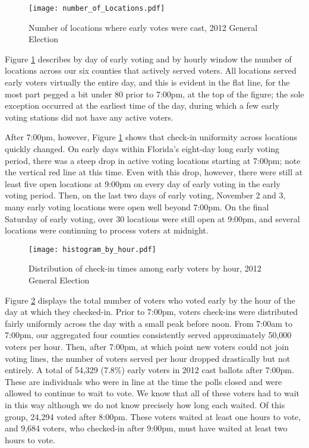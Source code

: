 \documentclass[12pt,titlepage]{article}
\begin{document}


\begin{figure}[!ht]
  \caption{Number of locations where early votes were cast, 2012
    General Election}
  \label{fig:nrlocs2012}
  \centering
    \centering\texttt{[image: number\_of\_Locations.pdf]}
\end{figure}

Figure \ref{fig:nrlocs2012} describes by day of early voting and by
hourly window the number of locations across our six counties that
actively served voters.  All locations served early voters virtually
the entire day, and this is evident in the flat line, for the most
part pegged a bit under 80 prior to 7:00pm, at the top of the figure;
the sole exception occurred at the earliest time of the day, during
which a few early voting stations did not have any active voters.

After 7:00pm, however, Figure \ref{fig:nrlocs2012} shows that check-in
uniformity across locations quickly changed.  On early days within
Florida's eight-day long early voting period, there was a steep drop
in active voting locations starting at 7:00pm; note the vertical red
line at this time.  Even with this drop, however, there were still at
least five open locations at 9:00pm on every day of early voting in
the early voting period.  Then, on the last two days of early voting,
November 2 and 3, many early voting locations were open well beyond
7:00pm.  On the final Saturday of early voting, over 30 locations were
still open at 9:00pm, and several locations were continuing to process
voters at midnight.

\begin{figure}[!ht]
\caption{Distribution of check-in times among early voters by hour, 2012
  General Election}
  \label{fig:hist2012}
  \centering
    \centering\texttt{[image: histogram\_by\_hour.pdf]}
\end{figure}

Figure \ref{fig:hist2012} displays the total number of voters who
voted early by the hour of the day at which they checked-in. Prior to
7:00pm, voters check-ins were distributed fairly uniformly across the
day with a small peak before noon.  From 7:00am to 7:00pm, our
aggregated four counties consistently served approximately 50,000
voters per hour. Then, after 7:00pm, at which point new voters could
not join voting lines, the number of voters served per hour dropped
drastically but not entirely.  A total of 54,329 (7.8\%) early voters
in 2012 cast ballots after 7:00pm. These are individuals who were in
line at the time the polls closed and were allowed to continue to wait
to vote.  We know that all of these voters had to wait in this way
although we do not know precisely how long each waited.  Of this
group, 24,294 voted after 8:00pm.  These voters waited at least one
hours to vote, and 9,684 voters, who checked-in after 9:00pm, must
have waited at least two hours to vote.
\end{document}
